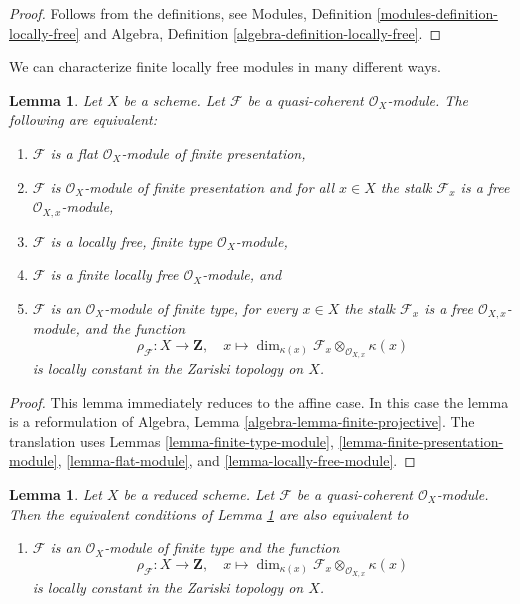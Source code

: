 \documentclass{stacks-project}
\theoremstyle{plain}
\newtheorem{lemma}[subsection]{Lemma}
\theoremstyle{definition}
\theoremstyle{remark}
\numberwithin{equation}{subsection}
\begin{document}
\begin{proof}
Follows from the definitions, see
Modules, Definition \ref{modules-definition-locally-free}
and
Algebra, Definition \ref{algebra-definition-locally-free}.
\end{proof}

\noindent
We can characterize finite locally free modules in many different ways.

\begin{lemma}
\label{lemma-finite-locally-free}
Let $X$ be a scheme.
Let $\mathcal{F}$ be a quasi-coherent $\mathcal{O}_X$-module.
The following are equivalent:
\begin{enumerate}
\item $\mathcal{F}$ is a flat $\mathcal{O}_X$-module of finite presentation,
\item $\mathcal{F}$ is $\mathcal{O}_X$-module of finite presentation and
for all $x \in X$ the stalk $\mathcal{F}_x$ is a free
$\mathcal{O}_{X, x}$-module,
\item $\mathcal{F}$ is a locally free, finite type $\mathcal{O}_X$-module,
\item $\mathcal{F}$ is a finite locally free $\mathcal{O}_X$-module, and
\item $\mathcal{F}$ is an $\mathcal{O}_X$-module of finite type,
for every $x \in X$ the stalk $\mathcal{F}_x$ is a free
$\mathcal{O}_{X, x}$-module, and the function
$$
\rho_\mathcal{F} : X \to \mathbf{Z}, \quad
x \longmapsto
\dim_{\kappa(x)} \mathcal{F}_x \otimes_{\mathcal{O}_{X, x}} \kappa(x)
$$
is locally constant in the Zariski topology on $X$.
\end{enumerate}
\end{lemma}

\begin{proof}
This lemma immediately reduces to the affine case.
In this case the lemma is a reformulation of
Algebra, Lemma \ref{algebra-lemma-finite-projective}.
The translation uses
Lemmas \ref{lemma-finite-type-module},
\ref{lemma-finite-presentation-module},
\ref{lemma-flat-module}, and
\ref{lemma-locally-free-module}.
\end{proof}

\begin{lemma}
\label{lemma-finite-locally-free-reduced}
Let $X$ be a reduced scheme. Let $\mathcal{F}$ be a quasi-coherent
$\mathcal{O}_X$-module. Then the equivalent conditions of
Lemma \ref{lemma-finite-locally-free} are also equivalent to
\begin{enumerate}
\item[(6)] $\mathcal{F}$ is an $\mathcal{O}_X$-module of finite type and
the function
$$
\rho_\mathcal{F} : X \to \mathbf{Z}, \quad
x \longmapsto
\dim_{\kappa(x)} \mathcal{F}_x \otimes_{\mathcal{O}_{X, x}} \kappa(x)
$$
is locally constant in the Zariski topology on $X$.
\end{enumerate}
\end{lemma}
\end{document}
